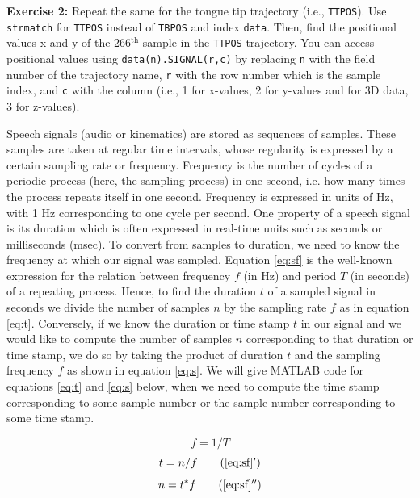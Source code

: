 \documentclass[a4paper, 12pt]{article}
\begin{document}
\noindent \textbf{Exercise 2:} Repeat the same for the tongue tip trajectory (i.e., \texttt{TTPOS}). Use \texttt{strmatch} for \texttt{TTPOS} instead of \texttt{TBPOS} and index \texttt{data}. Then, find the positional values x and y of the 266$^{\text{th}}$ sample in the \texttt{TTPOS} trajectory. You can access positional values using \texttt{data(n).SIGNAL(r,c)} by replacing \texttt{n} with the field number of the trajectory name, \texttt{r} with the row number which is the sample index, and \texttt{c} with the column (i.e., 1 for x-values, 2 for y-values and for 3D data, 3 for z-values).\par\smallskip

Speech signals (audio or kinematics) are stored as sequences of samples. These samples are taken at regular time intervals, whose regularity is expressed by a certain sampling rate or frequency. Frequency is the number of cycles of a periodic process (here, the sampling process) in one second, i.e. how many times the process repeats itself in one second. Frequency is expressed in units of Hz, with 1 Hz corresponding to one cycle per second. One property of a speech signal is its duration which is often expressed in real-time units such as seconds or milliseconds (msec). To convert from samples to duration, we need to know the frequency at which our signal was sampled. Equation \eqref{eq:sf} is the well-known expression for the relation between frequency $f$ (in Hz) and period $T$ (in seconds) of a repeating process. Hence, to find the duration $t$ of a sampled signal in seconds we divide the number of samples $n$ by the sampling rate $f$ as in equation \eqref{eq:t}. Conversely, if we know the duration or time stamp $t$ in our signal and we would like to compute the number of samples $n$ corresponding to that duration or time stamp, we do so by taking the product of duration $t$ and the sampling frequency $f$ as shown in equation \eqref{eq:s}. We will give MATLAB code for equations \eqref{eq:t} and \eqref{eq:s} below, when we need to compute the time stamp corresponding to some sample number or the sample number corresponding to some time stamp.

\begin{equation}
f = 1/T  \label{eq:sf}
\end{equation}
\begin{equation}
t = n/f  \tag{\ref*{eq:sf}$^\prime$}\label{eq:t}
\end{equation}
\begin{equation}
n = t^{*}f  \tag{\ref*{eq:sf}$^{\prime\prime}$}\label{eq:s}
\end{equation}
\end{document}
